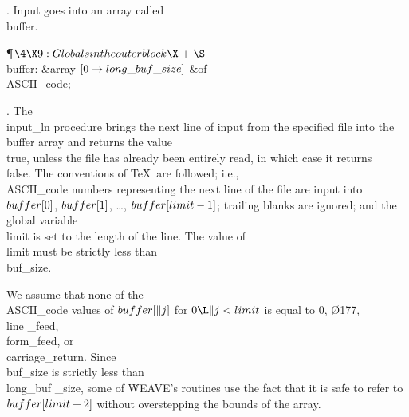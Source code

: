 . Input goes into an array called \\{buffer}.

\Y\P$\4\X9:Globals in the outer block\X\mathrel{+}\S$\6
\4\\{buffer}: \&{array} $[0\to\\{long\_buf\_size}]$ \1\&{of}\5
\\{ASCII\_code};\2\par
\fi

. The \\{input\_ln} procedure brings the next line of input from the
specified
file into the \\{buffer} array and returns the value \\{true}, unless the file
has
already been entirely read, in which case it returns \\{false}. The conventions
of \TeX\ are followed; i.e., \\{ASCII\_code} numbers representing the next line
of the file are input into $\\{buffer}[0]$, $\\{buffer}[1]$, \dots,
$\\{buffer}[\\{limit}-1]$; trailing blanks are ignored;
and the global variable \\{limit} is set to the length of the
line. The value of \\{limit} must be strictly less than \\{buf\_size}.

We assume that none of the \\{ASCII\_code} values
of $\\{buffer}[\|j]$ for $0\L\|j<\\{limit}$ is equal to 0, \O{177}, \\{line%
\_feed}, \\{form\_feed},
or \\{carriage\_return}. Since \\{buf\_size} is strictly less than \\{long\_buf%
\_size},
some of \.{WEAVE}'s routines use the fact that it is safe to refer to
$\\{buffer}[\\{limit}+2]$ without overstepping the bounds of the array.

